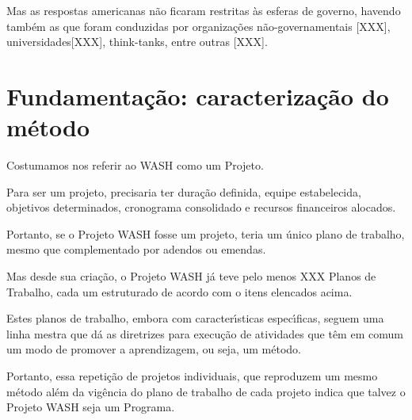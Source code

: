 \documentclass[
12pt,		%
openright,	%
twoside,  %
a4paper,			%
chapter=TITLE,		%
english,			%
french,				%
spanish,			%
brazil				%
]{USPSC-classe/USPSC_RedarTex}
\begin{document}
Mas as respostas americanas n\~ao ficaram restritas \`as esferas de governo, havendo tamb\'em as que foram conduzidas por organiza\c{c}\~oes n\~ao-governamentais [XXX], universidades[XXX], think-tanks, entre outras [XXX].








\section[Fundamenta\c{c}\~ao: caracteriza\c{c}\~ao do m\'etodo]{Fundamenta\c{c}\~ao: caracteriza\c{c}\~ao do m\'etodo}\label{Fundamenta\c{c}\~ao: caracteriza\c{c}\~ao do m\'etodo}
Costumamos nos referir ao WASH como um Projeto.








Para ser um projeto, precisaria ter dura\c{c}\~ao definida, equipe estabelecida, objetivos determinados, cronograma consolidado e recursos financeiros alocados.








Portanto, se o Projeto WASH fosse um projeto, teria um \'unico plano de trabalho, mesmo que complementado por adendos ou emendas.








Mas desde sua cria\c{c}\~ao, o Projeto WASH j\'a teve pelo menos XXX Planos de Trabalho, cada um estruturado de acordo com o itens elencados acima.








Estes planos de trabalho, embora com caracter\'{\i}sticas espec\'{\i}ficas, seguem uma linha mestra que d\'a as diretrizes para execu\c{c}\~ao de atividades que t\^em em comum um modo de promover a aprendizagem, ou seja, um m\'etodo.








Portanto, essa repeti\c{c}\~ao de projetos individuais, que reproduzem um mesmo m\'etodo al\'em da vig\^encia do plano de trabalho de cada projeto indica que talvez o Projeto WASH seja um Programa.
\end{document}

